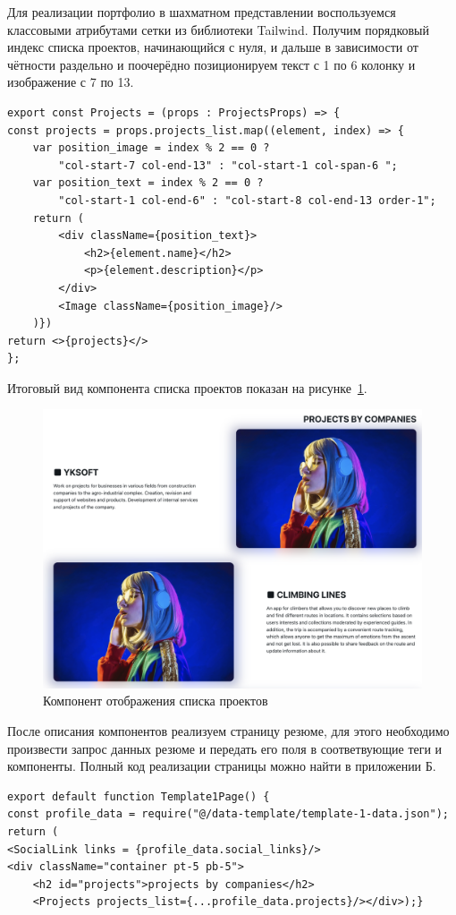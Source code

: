 \documentclass[master, och, diploma]{SCWorks}
\begin{document}
Для реализации портфолио в шахматном представлении воспользуемся классовыми атрибутами сетки из библиотеки Tailwind. Получим порядковый индекс списка проектов, начинающийся с нуля, и дальше в зависимости от чётности раздельно и поочерёдно позиционируем текст с 1 по 6 колонку и изображение с 7 по 13.
\begin{verbatim}
export const Projects = (props : ProjectsProps) => {
const projects = props.projects_list.map((element, index) => {
    var position_image = index % 2 == 0 ? 
        "col-start-7 col-end-13" : "col-start-1 col-span-6 ";
    var position_text = index % 2 == 0 ? 
        "col-start-1 col-end-6" : "col-start-8 col-end-13 order-1";
    return (
        <div className={position_text}>
            <h2>{element.name}</h2>
            <p>{element.description}</p>
        </div>
        <Image className={position_image}/>
    )})
return <>{projects}</>
};
\end{verbatim}

Итоговый вид компонента списка проектов показан на рисунке~\ref{fig:30}. 
\begin{figure}[!ht]
    \centering
    \includegraphics[width=12cm]{images/image-resume-3.png}
    \caption{\label{fig:30}%
        Компонент отображения списка проектов}
\end{figure}

После описания компонентов реализуем страницу резюме, для этого необходимо произвести запрос данных резюме и передать его поля в соответвующие теги и компоненты. Полный код реализации страницы можно найти в приложении Б.  
\begin{verbatim}
export default function Template1Page() {
const profile_data = require("@/data-template/template-1-data.json");
return (
<SocialLink links = {profile_data.social_links}/>
<div className="container pt-5 pb-5">
    <h2 id="projects">projects by companies</h2>
    <Projects projects_list={...profile_data.projects}/></div>);}    
\end{verbatim}
\end{document}
